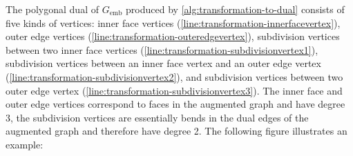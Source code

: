 The polygonal dual of $G_\text{emb}$ produced by \cref{alg:transformation-to-dual} consists of five kinds of vertices: inner face vertices (\cref{line:transformation-innerfacevertex}), outer edge vertices (\cref{line:transformation-outeredgevertex}), subdivision vertices between two inner face vertices (\cref{line:transformation-subdivisionvertex1}), subdivision vertices between an inner face vertex and an outer edge vertex (\cref{line:transformation-subdivisionvertex2}), and subdivision vertices between two outer edge vertex (\cref{line:transformation-subdivisionvertex3}).
The inner face and outer edge vertices correspond to faces in the augmented graph and have degree 3, the subdivision vertices are essentially bends in the dual edges of the augmented graph and therefore have degree 2.
The following figure illustrates an example:
%
\begin{figure}[H]
	\centering
	\quad
	\quad

\end{figure}
